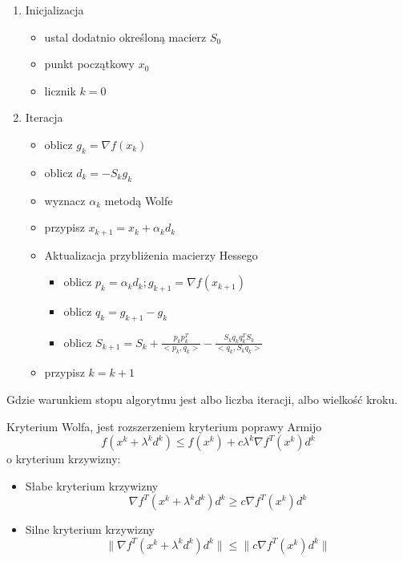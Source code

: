 \documentclass{classrep}
\begin{document}
\begin{enumerate}
\item Inicjalizacja
	\begin{itemize}
		\item ustal dodatnio określoną macierz $S_0$
		\item punkt początkowy $x_0$
		\item licznik $k=0$
	\end{itemize}
\item Iteracja
	\begin{itemize}
		\item oblicz $g_k = \nabla f(x_k)$
		\item oblicz $d_k = -S_k g_k$
		\item wyznacz $\alpha _k$ metodą Wolfe
		\item przypisz $x _{k+1} = x_k + \alpha _k d _k$
		\item Aktualizacja przybliżenia macierzy Hessego
		 \begin{itemize}
		 	\item oblicz $p_k = \alpha _k d _k ; g _{k+1} = \nabla f(x_{k+1})$
		 	\item oblicz $q_k = g_{k+1}-g_k$
		 	\item oblicz $S_{k+1}= S_{k} + \frac{p_{k}p_{k}^{T}}{< p_{k} , q_{k} >} - \frac{S_{k} q_{k} q_{k} ^{T} S_k }{< q_{k} , S_{k} q_{k}  >}$
		
		\end{itemize}
		\item przypisz $k=k+1$
	\end{itemize}
\end{enumerate}


Gdzie warunkiem stopu algorytmu jest albo liczba iteracji, albo wielkość kroku.


Kryterium Wolfa, jest rozszerzeniem kryterium poprawy Armijo
\begin{equation}
f( x^{k} + \lambda ^{k} d^{k} ) \leq f(x^{k}) + c \lambda ^{k} \nabla f^{T} (x ^{k} ) d^{k}
\end{equation}
 o kryterium krzywizny:
\begin{itemize}
\item Słabe kryterium krzywizny\\
	\begin{equation}
	\nabla f^{T} (x^{k} + \lambda ^{k} d^{k} ) d^{k} \geq c \nabla f^{T} (x ^{k} ) d^{k}
	\end{equation}
	
\item Silne kryterium krzywizny\\
	\begin{equation}
	\| \nabla f^{T} (x^{k} + \lambda ^{k} d^{k} ) d^{k} \| \leq \| c \nabla f^{T} (x ^{k} ) d^{k} \|
	\end{equation}

\end{itemize}
\end{document}
